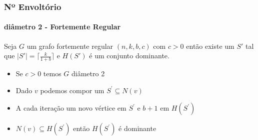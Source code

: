 \begin{frame}
\frametitle{Nº Envoltório}
\framesubtitle{diâmetro 2 - Fortemente Regular}
\begin{theo}
Seja $G$ um grafo fortemente regular $(n,k,b,c)$ com $c>0$ então existe um $S'$ tal que $|S'| = \big\lceil \frac{k}{1+b} \big\rceil$ e $H(S')$ é um conjunto dominante.
\label{dom-gfr} 
\end{theo}
\begin{itemize}
    \item Se $c > 0$ temos $G$ diâmetro 2
    \item Dado $v$ podemos compor um $S^\prime \subseteq N(v)$
    \item A cada iteração um novo vértice em $S^\prime$ e $b+1$ em $H(S^\prime)$
    \item $N(v) \subseteq H(S^\prime)$ então $H(S^\prime)$ é dominante
\end{itemize}
\end{frame}

